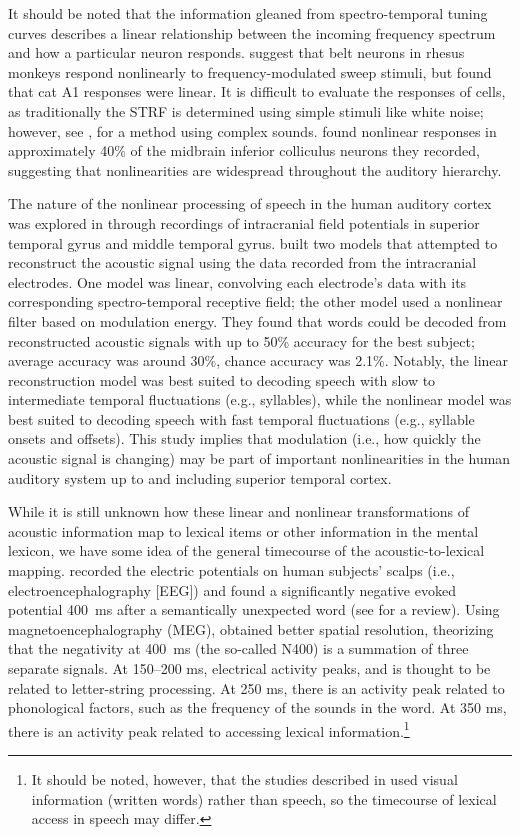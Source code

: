 It should be noted
that the information gleaned from
spectro-temporal tuning curves
describes a linear relationship
between the incoming frequency spectrum
and how a particular neuron responds.
\citet{tian2004}
suggest that belt neurons
in rhesus monkeys respond nonlinearly
to frequency-modulated sweep stimuli,
but \citet{kowalski1995}
found that cat A1 responses were linear.
It is difficult to evaluate
the responses of cells,
as traditionally the STRF
is determined using simple stimuli
like white noise;
however, see \citet{theunissen2000},
for a method using complex sounds.
\citet{escabi2002}
found nonlinear responses
in approximately 40\%
of the midbrain inferior colliculus
neurons they recorded,
suggesting that nonlinearities
are widespread
throughout the auditory hierarchy.

The nature of the nonlinear processing
of speech in the human auditory cortex
was explored in \citet{pasley2012}
through recordings of
intracranial field potentials
in superior temporal gyrus
and middle temporal gyrus.
\citeauthor{pasley2012} built
two models that attempted to
reconstruct the acoustic signal
using the data recorded from
the intracranial electrodes.
One model was linear,
convolving each electrode's data
with its corresponding
spectro-temporal receptive field;
the other model used
a nonlinear filter
based on modulation energy.
They found that
words could be decoded from
reconstructed acoustic signals
with up to 50\% accuracy
for the best subject;
average accuracy was around 30\%,
chance accuracy was 2.1\%.
Notably, the linear reconstruction model
was best suited to decoding speech
with slow to intermediate temporal fluctuations
(e.g., syllables),
while the nonlinear model was best suited
to decoding speech with fast temporal fluctuations
(e.g., syllable onsets and offsets).
This study implies that modulation
(i.e., how quickly the acoustic signal is changing)
may be part of important nonlinearities
in the human auditory system
up to and including superior temporal cortex.

While it is still unknown how
these linear and nonlinear
transformations of acoustic information
map to lexical items
or other information in the mental lexicon,
we have some idea of the general
timecourse of the
acoustic-to-lexical mapping.
\citet{kutas1980}
recorded the electric potentials
on human subjects' scalps
(i.e., electroencephalography [EEG])
and found a significantly
negative evoked potential
400~ms after a semantically unexpected word
(see \citealt{kutas2000} for a review).
Using magnetoencephalography (MEG),
\citet{pylkkanen2003}
obtained better spatial resolution,
theorizing that the negativity
at 400~ms (the so-called N400)
is a summation of three separate signals.
At 150--200 ms, electrical activity peaks,
and is thought to be related to
letter-string processing.
At 250 ms, there is an activity peak
related to phonological factors,
such as the frequency of the sounds in the word.
At 350 ms, there is an activity peak
related to accessing
lexical information.\footnote{
  It should be noted, however,
  that the studies described in
  \citet{pylkkanen2003} used visual information
  (written words) rather than speech,
  so the timecourse of lexical access
  in speech may differ.}

